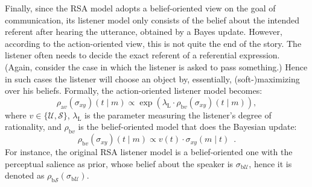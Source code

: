 Finally, since the RSA model adopts a belief-oriented view on the goal
of communication, its listener model only consists of the belief about
the intended referent after hearing the utterance, obtained by a Bayes
update. However, according to the action-oriented view, this is not
quite the end of the story. The listener often needs to decide the
exact referent of a referential expression. (Again, consider the case
in which the listener is asked to pass something.) Hence in such cases
the listener will choose an object by, essentially, (soft-)maximizing
over his beliefs. Formally, the action-oriented listener model
becomes:
\begin{equation} \label{listener-action}
\rho_{\mathrm{a}v}(\sigma_{xy})(t \mid m) \propto \exp(\lambda_\mathrm{L} \cdot \rho_{\mathrm{b}v}(\sigma_{xy})(t \mid m) ),
\end{equation}
where $v\in\{\mathcal{U},\mathcal{S}\}$, $\lambda_\mathrm{L}$ is the
parameter measuring the listener's degree of rationality, and
$\rho_{\mathrm{b}v}$ is the belief-oriented model that does the
Bayesian update:
\begin{equation} \label{listener-belief}
\rho_{\mathrm{b}v}(\sigma_{xy})(t \mid m) \propto v(t)\cdot \sigma_{xy}(m \mid t) \enspace .
\end{equation}
For instance, the original RSA listener model is a belief-oriented one with the perceptual salience as prior, whose belief about the speaker is $\sigma_{\mathrm{b}\mathcal{U}}$, hence it is denoted as $\rho_{\mathrm{b}\mathcal{S}}(\sigma_{\mathrm{b}\mathcal{U}})$.


